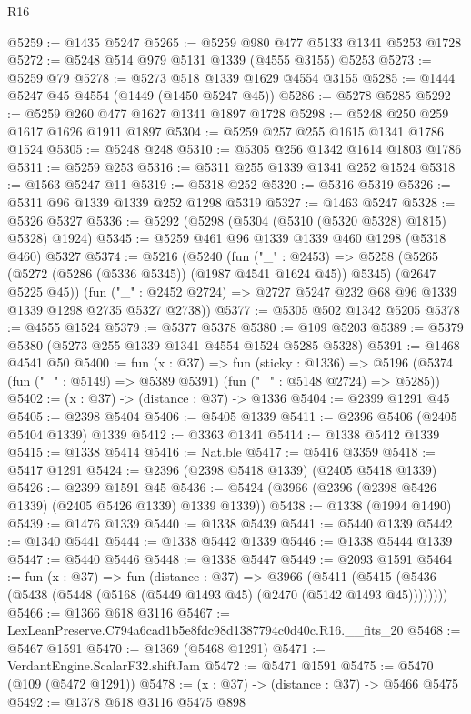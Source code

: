 \begin{lexlean}{R16}
\begin{coremodule}
@5259 := @1435 @5247
@5265 := @5259 @980 @477 @5133 @1341 @5253 @1728
@5272 := @5248 @514 @979 @5131 @1339 (@4555 @3155) @5253
@5273 := @5259 @79
@5278 := @5273 @518 @1339 @1629 @4554 @3155
@5285 := @1444 @5247 @45 @4554 (@1449 (@1450 @5247 @45))
@5286 := @5278 @5285
@5292 := @5259 @260 @477 @1627 @1341 @1897 @1728
@5298 := @5248 @250 @259 @1617 @1626 @1911 @1897
@5304 := @5259 @257 @255 @1615 @1341 @1786 @1524
@5305 := @5248 @248
@5310 := @5305 @256 @1342 @1614 @1803 @1786
@5311 := @5259 @253
@5316 := @5311 @255 @1339 @1341 @252 @1524
@5318 := @1563 @5247 @11
@5319 := @5318 @252
@5320 := @5316 @5319
@5326 := @5311 @96 @1339 @1339 @252 @1298 @5319
@5327 := @1463 @5247
@5328 := @5326 @5327
@5336 := @5292 (@5298 (@5304 (@5310 (@5320 @5328) @1815) @5328) @1924)
@5345 := @5259 @461 @96 @1339 @1339 @460 @1298 (@5318 @460) @5327
@5374 := @5216
    (@5240
      (fun ("_" : @2453) =>
      @5258 (@5265 (@5272 (@5286 (@5336 @5345)) (@1987 @4541 @1624 @45)) @5345) (@2647 @5225 @45))
      (fun ("_" : @2452 @2724) => @2727 @5247 @232 @68 @96 @1339 @1339 @1298 @2735 @5327 @2738))
@5377 := @5305 @502 @1342 @5205
@5378 := @4555 @1524
@5379 := @5377 @5378
@5380 := @109 @5203
@5389 := @5379 @5380 (@5273 @255 @1339 @1341 @4554 @1524 @5285 @5328)
@5391 := @1468 @4541 @50
@5400 := fun (x : @37) =>
  fun (sticky : @1336) =>
  @5196 (@5374 (fun ("_" : @5149) => @5389 @5391) (fun ("_" : @5148 @2724) => @5285))
@5402 := (x : @37) -> (distance : @37) -> @1336
@5404 := @2399 @1291 @45
@5405 := @2398 @5404
@5406 := @5405 @1339
@5411 := @2396 @5406 (@2405 @5404 @1339) @1339
@5412 := @3363 @1341
@5414 := @1338 @5412 @1339
@5415 := @1338 @5414
@5416 := Nat.ble
@5417 := @5416 @3359
@5418 := @5417 @1291
@5424 := @2396 (@2398 @5418 @1339) (@2405 @5418 @1339)
@5426 := @2399 @1591 @45
@5436 := @5424 (@3966 (@2396 (@2398 @5426 @1339) (@2405 @5426 @1339) @1339 @1339))
@5438 := @1338 (@1994 @1490)
@5439 := @1476 @1339
@5440 := @1338 @5439
@5441 := @5440 @1339
@5442 := @1340 @5441
@5444 := @1338 @5442 @1339
@5446 := @1338 @5444 @1339
@5447 := @5440 @5446
@5448 := @1338 @5447
@5449 := @2093 @1591
@5464 := fun (x : @37) =>
  fun (distance : @37) =>
  @3966 (@5411 (@5415 (@5436 (@5438 (@5448 (@5168 (@5449 @1493 @45) (@2470 (@5142 @1493 @45))))))))
@5466 := @1366 @618 @3116
@5467 := LexLeanPreserve.C794a6cad1b5e8fdc98d1387794c0d40c.R16.__fits_20
@5468 := @5467 @1591
@5470 := @1369 (@5468 @1291)
@5471 := VerdantEngine.ScalarF32.shiftJam
@5472 := @5471 @1591
@5475 := @5470 (@109 (@5472 @1291))
@5478 := (x : @37) -> (distance : @37) -> @5466 @5475
@5492 := @1378
    @618
    @3116
    @5475
    @898

\end{coremodule}
\end{lexlean}
